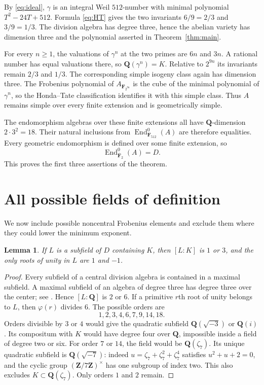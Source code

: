 \documentclass[11pt,a4paper]{article}
\newcommand{\Q}{\mathbf Q}
\newcommand{\Z}{\mathbf Z}
\newcommand{\F}{\mathbf F}
\newcommand{\End}{\operatorname{End}}
\newtheorem{lemma}[theorem]{Lemma}
\theoremstyle{definition}
\theoremstyle{remark}
\begin{document}
By \eqref{eq:ideal}, $\gamma$ is an integral Weil $512$-number
with minimal polynomial $T^2-24T+512$. Formula \eqref{eq:HT}
gives the two invariants $6/9=2/3$ and $3/9=1/3$. The division
algebra has degree three, hence the abelian variety has dimension
three and the polynomial asserted in Theorem~\ref{thm:main}.

For every $n\geq1$, the valuations of $\gamma^n$ at the two
primes are $6n$ and $3n$. A rational number has equal valuations
there, so $\Q(\gamma^n)=K$. Relative to $2^{9n}$ its invariants
remain $2/3$ and $1/3$. The corresponding simple isogeny class again
has dimension three. The Frobenius polynomial of
$A_{\F_{2^{9n}}}$ is the cube of the minimal polynomial of
$\gamma^n$, so the Honda--Tate classification identifies it with
this simple class. Thus $A$ remains simple over every finite
extension and is geometrically simple.

The endomorphism algebras over these finite extensions all have
$\Q$-dimension $2\cdot3^2=18$. Their natural inclusions from
$\End^0_{\F_{512}}(A)$ are therefore equalities. Every geometric
endomorphism is defined over some finite extension, so
\[
                     \End^0_{\overline{\F}_2}(A)=D.
\]
This proves the first three assertions of the theorem.

\section{All possible fields of definition}

We now include possible noncentral Frobenius elements and exclude
them where they could lower the minimum exponent.

\begin{lemma}\label{lem:torsion}
If $L$ is a subfield of $D$ containing $K$, then $[L:K]$ is
$1$ or $3$, and the only roots of unity in $L$ are $1$ and $-1$.
\end{lemma}
\begin{proof}
Every subfield of a central division algebra is contained in a
maximal subfield. A maximal subfield of an algebra of degree three
has degree three over the center; see
\citet[Lemma 11.7.4, Tag 074W]{Stacks}. Hence $[L:\Q]$ is $2$
or $6$. If a primitive $r$th root of unity belongs to $L$, then
$\varphi(r)$ divides $6$. The possible orders are
\[
                        1,2,3,4,6,7,9,14,18.
\]
Orders divisible by $3$ or $4$ would give the quadratic subfield
$\Q(\sqrt{-3})$ or $\Q(i)$. Its compositum with $K$ would have
degree four over $\Q$, impossible inside a field of degree two or
six. For order $7$ or $14$, the field would be $\Q(\zeta_7)$.
Its unique quadratic subfield is $\Q(\sqrt{-7})$: indeed
$u=\zeta_7+\zeta_7^2+\zeta_7^4$ satisfies $u^2+u+2=0$,
and the cyclic group $(\Z/7\Z)^\times$ has one subgroup of
index two. This also excludes $K\subset\Q(\zeta_7)$.
Only orders $1$ and $2$ remain.
\end{proof}
\end{document}
